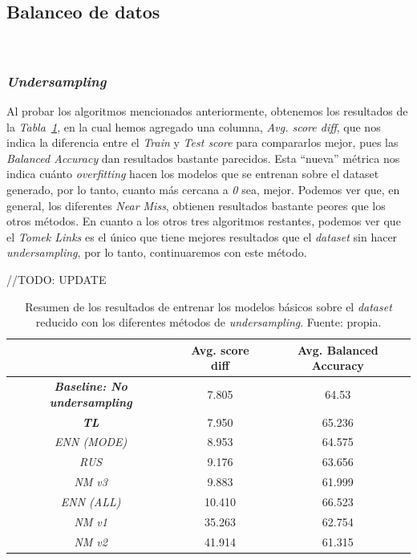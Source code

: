 \subsection{Balanceo de datos}\ \label{sec:i2-balance}

\subsubsection{\textit{Undersampling}}

Al probar los algoritmos mencionados anteriormente, obtenemos los resultados de la \textit{Tabla\ \ref{tab:undersampling-methods}}, en la cual hemos agregado una columna, \textit{Avg. score diff}, que nos indica la diferencia entre el \textit{Train} y \textit{Test score} para compararlos mejor, pues las \textit{Balanced Accuracy} dan resultados bastante parecidos. Esta ``nueva'' métrica nos indica cuánto \textit{overfitting} hacen los modelos que se entrenan sobre el dataset generado, por lo tanto, cuanto más cercana a \textit{0} sea, mejor. Podemos ver que, en general, los diferentes \textit{Near Miss}, obtienen resultados bastante peores que los otros métodos. En cuanto a los otros tres algoritmos restantes, podemos ver que el \textit{Tomek Links} es el único que tiene mejores resultados que el \textit{dataset} sin hacer \textit{undersampling}, por lo tanto, continuaremos con este método.

//TODO: UPDATE
\begin{table}[!h]
    \centering
    \begin{tabular}{|c|cc|} \hline
        & Avg. score diff & Avg. Balanced Accuracy \\ \hline
        \textit{\textbf{Baseline: No undersampling}} & 7.805 & 64.53 \\ 
        \textit{\textbf{TL}} & 7.950 & 65.236 \\ 
        \textit{ENN (MODE)} & 8.953 & 64.575 \\ 
        \textit{RUS} & 9.176 & 63.656 \\ 
        \textit{NM v3} & 9.883 & 61.999 \\ 
        \textit{ENN (ALL)} & 10.410 & 66.523 \\ 
        \textit{NM v1} & 35.263 & 62.754 \\ 
        \textit{NM v2} & 41.914 & 61.315 \\ \hline
    \end{tabular}
    \caption{Resumen de los resultados de entrenar los modelos básicos sobre el \textit{dataset} reducido con los diferentes métodos de \textit{undersampling}. Fuente: propia.}\ \label{tab:undersampling-methods}
\end{table}

